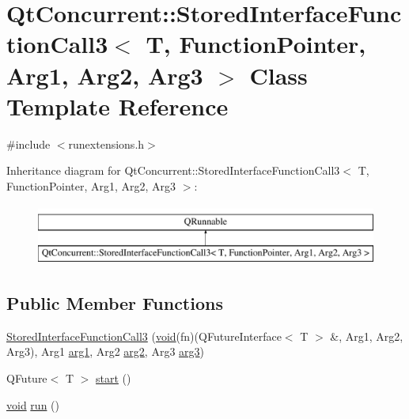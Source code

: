 \hypertarget{class_qt_concurrent_1_1_stored_interface_function_call3}{\section{Qt\-Concurrent\-:\-:Stored\-Interface\-Function\-Call3$<$ T, Function\-Pointer, Arg1, Arg2, Arg3 $>$ Class Template Reference}
\label{class_qt_concurrent_1_1_stored_interface_function_call3}
}


{\ttfamily \#include $<$runextensions.\-h$>$}

Inheritance diagram for Qt\-Concurrent\-:\-:Stored\-Interface\-Function\-Call3$<$ T, Function\-Pointer, Arg1, Arg2, Arg3 $>$\-:\begin{figure}[H]
\begin{center}
\leavevmode
\includegraphics[height=2.000000cm]{class_qt_concurrent_1_1_stored_interface_function_call3}
\end{center}
\end{figure}
\subsection*{Public Member Functions}
\begin{DoxyCompactItemize}
\item 
\hyperlink{class_qt_concurrent_1_1_stored_interface_function_call3_aab650138bdc7b62f6378abc2f8e8429b}{Stored\-Interface\-Function\-Call3} (\hyperlink{group___u_a_v_objects_plugin_ga444cf2ff3f0ecbe028adce838d373f5c}{void}(fn)(Q\-Future\-Interface$<$ T $>$ \&, Arg1, Arg2, Arg3), Arg1 \hyperlink{glext_8h_a4b247ab422408c1761a36f9034c2585b}{arg1}, Arg2 \hyperlink{glext_8h_a5aee5a44bf92a9837fea48e41ef0df57}{arg2}, Arg3 \hyperlink{glext_8h_a525a52cc20e1aa70741e5c7dae172f25}{arg3})
\item 
Q\-Future$<$ T $>$ \hyperlink{class_qt_concurrent_1_1_stored_interface_function_call3_ae27e1e2dd890acfac0bc5fd39264d031}{start} ()
\item 
\hyperlink{group___u_a_v_objects_plugin_ga444cf2ff3f0ecbe028adce838d373f5c}{void} \hyperlink{class_qt_concurrent_1_1_stored_interface_function_call3_ac037e957e140a31927ecd532b8ef84fb}{run} ()
\end{DoxyCompactItemize}


